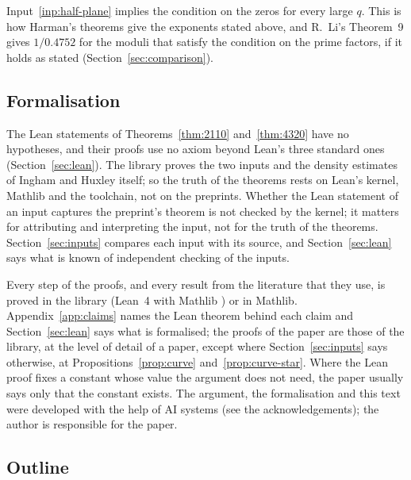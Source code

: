 \documentclass[11pt]{article}
\theoremstyle{definition}
\begin{document}
Input~\ref{inp:half-plane} implies the condition on the zeros for every large $q$. This is how Harman's theorems give
the exponents stated above, and R.~Li's Theorem~9 gives $1/0.4752$ for the moduli that satisfy the condition on the
prime factors, if it holds as stated (Section~\ref{sec:comparison}).

\subsection*{Formalisation}

The Lean statements of Theorems~\ref{thm:2110} and~\ref{thm:4320} have no hypotheses, and their proofs use no axiom
beyond Lean's three standard ones (Section~\ref{sec:lean}). The library proves the two inputs and the density estimates
of Ingham and Huxley itself; so the truth of the theorems rests on Lean's kernel, Mathlib and the toolchain, not on the
preprints. Whether the Lean statement of an input captures the preprint's theorem is not checked by the kernel; it
matters for attributing and interpreting the input, not for the truth of the theorems. Section~\ref{sec:inputs} compares
each input with its source, and Section~\ref{sec:lean} says what is known of independent checking of the inputs.

Every step of the proofs, and every result from the literature that they use, is proved in the library \cite{repo}
(Lean~4 \cite{lean4} with Mathlib \cite{mathlib}) or in Mathlib.
Appendix~\ref{app:claims} names the Lean theorem behind each claim and Section~\ref{sec:lean} says what is formalised;
the proofs of the paper are those of the library, at the level of detail of a paper, except where
Section~\ref{sec:inputs} says otherwise, at Propositions~\ref{prop:curve} and~\ref{prop:curve-star}. Where the Lean
proof fixes a constant whose value the argument does not need, the paper usually says only that the constant exists.
The argument, the formalisation and this text were developed with the help of AI systems (see the acknowledgements);
the author is responsible for the paper.

\subsection*{Outline}
\end{document}
